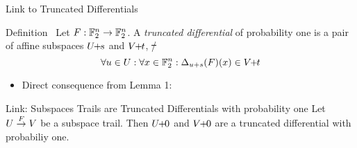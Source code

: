 \begin{frame}{Link to Truncated Differentials}
    \begin{block}{Definition~\cite{FSE:Knudsen94,FSE:BloLeaNyb14}}
        Let $F : \mathbb{F}_2^n \to \mathbb{F}_2^n$.
        A \emph{truncated differential} of probability one is a pair of affine subspaces $U \!\! + \!\! s$ and $V \!\! + \!\! t$, \st/
        \begin{equation*}
            \forall u \in U : \forall x \in \mathbb{F}_2^n : \Delta_{u + s}(F)(x) \in V \!\! + \!\! t
        \end{equation*}
    \end{block}
    \begin{itemize}
        \item Direct consequence from Lemma 1:
    \end{itemize}
    \begin{block}{Link: Subspaces Trails are Truncated Differentials with probability one}
        \vspace{0.5em}
        Let $U \stackrel{F}{\rightarrow} V$ be a subspace trail.
        Then $U \!\! + \!\! 0$ and $V \!\! + \!\! 0$ are a truncated differential with probabiliy one.
        \vspace{0.5em}
    \end{block}
\end{frame}

